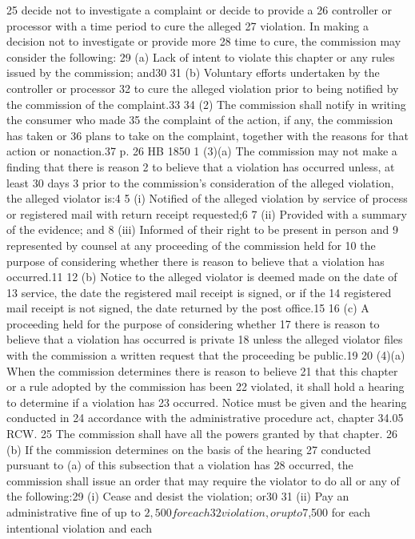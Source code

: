 25 decide not to investigate a complaint or decide to provide a
26 controller or processor with a time period to cure the alleged
27 violation. In making a decision not to investigate or provide more
28 time to cure, the commission may consider the following:
29 (a) Lack of intent to violate this chapter or any rules issued by
the commission; and30
31 (b) Voluntary efforts undertaken by the controller or processor
32 to cure the alleged violation prior to being notified by the
commission of the complaint.33
34 (2) The commission shall notify in writing the consumer who made
35 the complaint of the action, if any, the commission has taken or
36 plans to take on the complaint, together with the reasons for that
action or nonaction.37
p. 26 HB 1850
1 (3)(a) The commission may not make a finding that there is reason
2 to believe that a violation has occurred unless, at least 30 days
3 prior to the commission's consideration of the alleged violation, the
alleged violator is:4
5 (i) Notified of the alleged violation by service of process or
registered mail with return receipt requested;6
7 (ii) Provided with a summary of the evidence; and
8 (iii) Informed of their right to be present in person and
9 represented by counsel at any proceeding of the commission held for
10 the purpose of considering whether there is reason to believe that a
violation has occurred.11
12 (b) Notice to the alleged violator is deemed made on the date of
13 service, the date the registered mail receipt is signed, or if the
14 registered mail receipt is not signed, the date returned by the post
office.15
16 (c) A proceeding held for the purpose of considering whether
17 there is reason to believe that a violation has occurred is private
18 unless the alleged violator files with the commission a written
request that the proceeding be public.19
20 (4)(a) When the commission determines there is reason to believe
21 that this chapter or a rule adopted by the commission has been
22 violated, it shall hold a hearing to determine if a violation has
23 occurred. Notice must be given and the hearing conducted in
24 accordance with the administrative procedure act, chapter 34.05 RCW.
25 The commission shall have all the powers granted by that chapter.
26 (b) If the commission determines on the basis of the hearing
27 conducted pursuant to (a) of this subsection that a violation has
28 occurred, the commission shall issue an order that may require the
violator to do all or any of the following:29
(i) Cease and desist the violation; or30
31 (ii) Pay an administrative fine of up to $2,500 for each
32 violation, or up to $7,500 for each intentional violation and each
